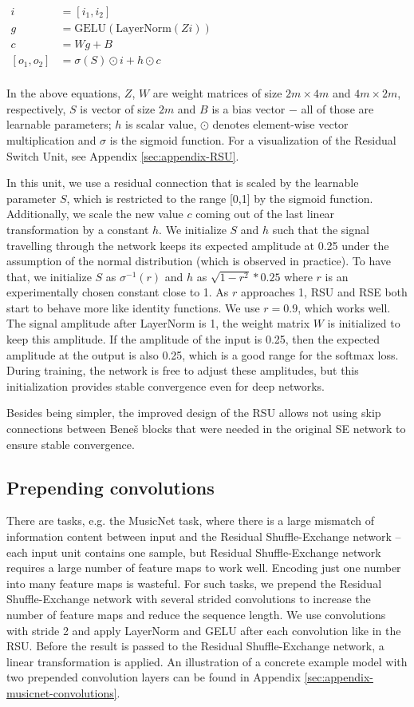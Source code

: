 \documentclass[letterpaper]{article} %
\begin{document}
\centerline{$\begin{aligned}
i &= [i_1, i_2] \\
g &= \text{GELU}(\text{LayerNorm}(Z i))\\
c &= Wg + B\\
[o_1, o_2] &= \sigma(S)\odot i + h \odot c \\
\end{aligned}$}

In the above equations, $Z$, $W$ are weight matrices of size $2m \times 4m$ and $4m \times 2m$, respectively, $S$ is vector of size $2m$ and $B$ is a bias vector $-$ all of those are learnable parameters; $h$ is scalar value, $\odot$ denotes element-wise vector multiplication and $\sigma$ is the sigmoid function. For a visualization of the Residual Switch Unit, see Appendix \ref{sec:appendix-RSU}.

In this unit, we use a residual connection that is scaled by the learnable parameter $S$, which is restricted to the range [0,1] by the sigmoid function. Additionally, we scale the new value $c$ coming out of the last linear transformation by a constant $h$. We initialize $S$ and $h$ such that the signal travelling through the network keeps its expected amplitude at 0.25 under the assumption of the normal distribution (which is observed in practice). To have that, we initialize $S$ as $\sigma^{-1}(r)$ and $h$ as $\sqrt{1-r^2}*0.25$ where $r$ is an experimentally chosen constant close to 1. As $r$ approaches 1, RSU and RSE both start to behave more like identity functions. We use $r=0.9$, which works well. The signal amplitude after LayerNorm is 1, the weight matrix $W$ is initialized to keep this amplitude. If the amplitude of the input is 0.25, then the expected amplitude at the output is also 0.25, which is a good range for the softmax loss. During training, the network is free to adjust these amplitudes, but this initialization provides stable convergence even for deep networks.

Besides being simpler, the improved design of the RSU allows not using skip connections between Bene\v{s} blocks that were needed in the original SE network to ensure stable convergence. 

\subsection{Prepending convolutions}
There are tasks, e.g. the MusicNet task, where there is a large mismatch of information content between input and the Residual Shuffle-Exchange network -- each input unit contains one sample, but Residual Shuffle-Exchange network requires a large number of feature maps to work well. Encoding just one number into many feature maps is wasteful. For such tasks, we prepend the Residual Shuffle-Exchange network with several strided convolutions to increase the number of feature maps and reduce the sequence length. We use convolutions with stride 2 and apply LayerNorm and GELU after each convolution like in the RSU. Before the result is passed to the Residual Shuffle-Exchange network, a linear transformation is applied. An illustration of a concrete example model with two prepended convolution layers can be found in Appendix \ref{sec:appendix-musicnet-convolutions}.
\end{document}
